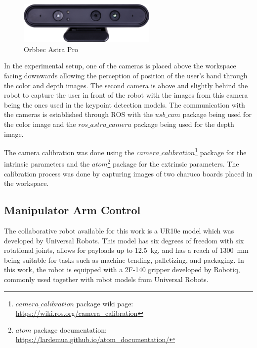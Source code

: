 \begin{figure}[ht]
\centerline{\includegraphics[width=0.6\textwidth]{figs/AstraPro.jpg}}
\caption[Orbbec Astra Pro]{Orbbec Astra Pro \cite{AstraPro}}
\label{fig:orbbec_astra_pro}
\end{figure}

In the experimental setup, one of the cameras is placed above the workspace facing downwards allowing the perception of position of the user's hand through the color and depth images. The second camera is above and slightly behind the robot to capture the user in front of the robot with the images from this camera being the ones used in the keypoint detection models. The communication with the cameras is established through ROS with the $usb\_cam$ package being used for the color image and the $ros\_astra\_camera$ package being used for the depth image.

The camera calibration was done using the $camera\_calibration$\footnote{$camera\_calibration$ package wiki page: \url{https://wiki.ros.org/camera_calibration}} package for the intrinsic parameters and the $atom$\footnote{$atom$ package documentation: \url{https://lardemua.github.io/atom_documentation/}} package for the extrinsic parameters. The calibration process was done by capturing images of two charuco boards placed in the workspace.

\subsection{Manipulator Arm Control}
\label{subsection:manipulator_arm_control}

The collaborative robot available for this work is a UR10e model which was developed by Universal Robots. This model has six degrees of freedom with six rotational joints, allows for payloads up to \SI{12.5}{\kilogram}, and has a reach of \SI{1300}{\milli\metre} being suitable for tasks such as machine tending, palletizing, and packaging\cite{UR10e}. In this work, the robot is equipped with a 2F-140 gripper developed by Robotiq, commonly used together with robot models from Universal Robots\cite{robotiq_gripper}.

